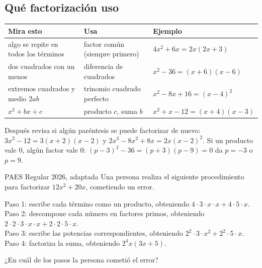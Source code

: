 \subsection{Qué factorización uso}
\begin{center}
\small\begin{tabular}{@{}lll@{}}
\toprule
Mira esto & Usa & Ejemplo\\ \midrule
algo se repite en todos los términos & factor común (siempre primero) & $4x^2 + 6x = 2x(2x + 3)$\\
dos cuadrados con un menos & diferencia de cuadrados & $x^2 - 36 = (x + 6)(x - 6)$\\
extremos cuadrados y medio $2ab$ & trinomio cuadrado perfecto & $x^2 - 8x + 16 = (x - 4)^2$\\
$x^2 + bx + c$ & producto $c$, suma $b$ & $x^2 + x - 12 = (x + 4)(x - 3)$\\ \bottomrule
\end{tabular}
\end{center}
Después revisa si algún paréntesis se puede factorizar de nuevo: $3x^2 - 12 = 3(x + 2)(x - 2)$ y $2x^3 - 8x^2 + 8x = 2x(x - 2)^2$. Si un producto vale 0, algún factor vale 0: $(p - 3)^2 - 36 = (p + 3)(p - 9) = 0$ da $p = -3$ o $p = 9$.

\begin{elejemplo}{PAES Regular 2026, adaptada}
Una persona realiza el siguiente procedimiento para factorizar $12x^2 + 20x$, cometiendo un error.

Paso 1: escribe cada término como un producto, obteniendo $4\cdot 3\cdot x\cdot x + 4\cdot 5\cdot x$.\\
Paso 2: descompone cada número en factores primos, obteniendo $2\cdot 2\cdot 3\cdot x\cdot x + 2\cdot 2\cdot 5\cdot x$.\\
Paso 3: escribe las potencias correspondientes, obteniendo $2^2\cdot 3\cdot x^2 + 2^2\cdot 5\cdot x$.\\
Paso 4: factoriza la suma, obteniendo $2^4x(3x + 5)$.

¿En cuál de los pasos la persona cometió el error?
\end{elejemplo}

